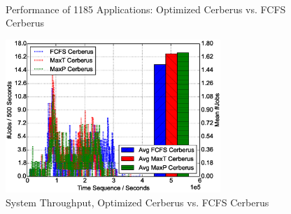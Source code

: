 \begin{figure}[!t]
        \centering
        ~
        \caption{Performance of 1185 Applications: Optimized Cerberus vs. FCFS Cerberus}
        \label{Fig:DPvsFIFOPerformance}
\end{figure}

\begin{figure}[!t]
        \centering
        \includegraphics[width=3.2in]{DPvsFIFOFigures/1000jobs_dp_vs_fifo_throughput}
        \caption{System Throughput, Optimized Cerberus vs. FCFS Cerberus}
        \label{Fig:DPvsFIFOThroughput}
\end{figure}

